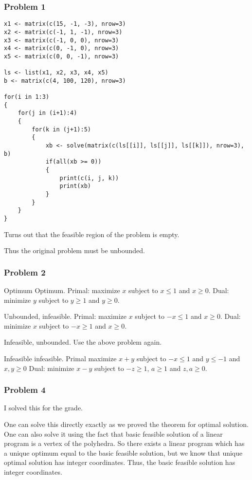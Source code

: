 \documentclass[11pt]{article}
\begin{document}
\subsubsection{Problem 1}
\label{sec:orgd697141}
\begin{verbatim}
x1 <- matrix(c(15, -1, -3), nrow=3)
x2 <- matrix(c(-1, 1, -1), nrow=3)
x3 <- matrix(c(-1, 0, 0), nrow=3)
x4 <- matrix(c(0, -1, 0), nrow=3)
x5 <- matrix(c(0, 0, -1), nrow=3)

ls <- list(x1, x2, x3, x4, x5)
b <- matrix(c(4, 100, 120), nrow=3)

for(i in 1:3)
{
    for(j in (i+1):4)
    {
        for(k in (j+1):5)
        {
            xb <- solve(matrix(c(ls[[i]], ls[[j]], ls[[k]]), nrow=3), b)
            if(all(xb >= 0))
            {
                print(c(i, j, k))
                print(xb)
            }
        }
    }
}
\end{verbatim}

Turns out that the feasible region of the problem is empty.

Thus the original problem must be unbounded.
\subsubsection{Problem 2}
\label{sec:org3532b33}
Optimum Optimum. Primal: maximize \(x\) subject to \(x \le 1\) and \(x \ge 0\).
Dual: minimize \(y\) subject to \(y \ge 1\) and \(y \ge 0\).

Unbounded, infeasible. Primal: maximize \(x\) subject to \(-x \le 1\) and \(x \ge
    0\). Dual: minimize \(x\) subject to \(-x \ge 1\) and \(x \ge 0\).

Infeasible, unbounded. Use the above problem again.

Infeasible infeasible. Primal maximize \(x + y\) subject to \(-x \le 1\) and \(y
    \le -1\) and \(x, y \ge 0\) Dual: minimize \(x - y\) subject to \(-z \ge 1\), \(a
    \ge 1\) and \(z, a \ge 0\).
\subsubsection{Problem 4}
\label{sec:org4c8ca76}
I solved this for the grade.

One can solve this directly exactly as we proved the theorem for optimal
solution. One can also solve it using the fact that basic feasible solution
of a linear program is a vertex of the polyhedra. So there exists a linear
program which has a unique optimum equal to the basic feasible solution, but
we know that unique optimal solution has integer coordinates. Thus, the
basic feasible solution has integer coordinates.
\end{document}

